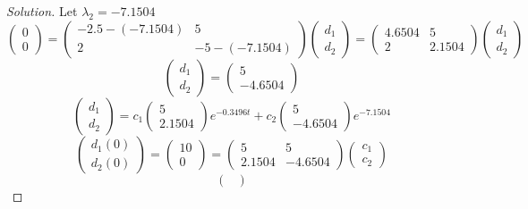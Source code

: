 \documentclass[12pt]{article}
\begin{document}
\begin{proof}[Solution]
		Let $\lambda_2 = -7.1504$
		$$
		\begin{pmatrix}
		0 \\
		0
		\end{pmatrix} = 
		\begin{pmatrix}
		-2.5 - (-7.1504) & 5 \\
		2 & -5 - (-7.1504)
		\end{pmatrix}
		\begin{pmatrix}
		d_1 \\
		d_2
		\end{pmatrix} = 
		\begin{pmatrix}
		4.6504 & 5 \\
		2 & 2.1504
		\end{pmatrix}
		\begin{pmatrix}
		d_1 \\
		d_2
		\end{pmatrix} 
		$$
		$$
		\begin{pmatrix}
		d_1 \\
		d_2
		\end{pmatrix} = 
		\begin{pmatrix}
		5 \\
		-4.6504
		\end{pmatrix}
		$$
		\newpage
		$$
		\begin{pmatrix}
			d_1 \\
			d_2
		\end{pmatrix} = 
		c_1
		\begin{pmatrix}
			5 \\
			2.1504
		\end{pmatrix} 
		e^{-0.3496t} + 
		c_2 
		\begin{pmatrix}
			5 \\
			-4.6504
		\end{pmatrix}
		e^{-7.1504}
		$$
		$$
		\begin{pmatrix}
			d_1(0) \\
			d_2(0) 
		\end{pmatrix} = 
		\begin{pmatrix}
			10 \\
			0
		\end{pmatrix} =
		\begin{pmatrix}
			5 & 5\\
			2.1504 & -4.6504
		\end{pmatrix} 
		\begin{pmatrix}
			c_1 \\
			c_2
		\end{pmatrix}
		$$
		$$
		\begin{pmatrix}

\end{pmatrix}$$
\end{proof}
\end{document}
